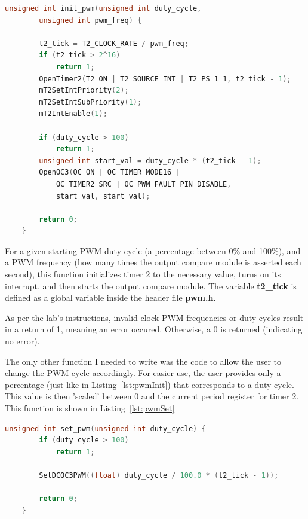 \documentclass[a4paper, 12pt]{article}
\begin{document}
	\begin{mdframed}[backgroundcolor=code-gray, roundcorner=10pt,
								innerleftmargin=5, innertopmargin=5, innerbottommargin=5]	
	\begin{lstlisting}[language=C, caption=PWM and Timer 2 Initialization, tabsize=2, label={lst:pwmInit}]
	unsigned int init_pwm(unsigned int duty_cycle,
		unsigned int pwm_freq) {
		
		t2_tick = T2_CLOCK_RATE / pwm_freq;
		if (t2_tick > 2^16)
			return 1;
		OpenTimer2(T2_ON | T2_SOURCE_INT | T2_PS_1_1, t2_tick - 1);
		mT2SetIntPriority(2);
		mT2SetIntSubPriority(1);
		mT2IntEnable(1);

		if (duty_cycle > 100)
			return 1;
		unsigned int start_val = duty_cycle * (t2_tick - 1);
		OpenOC3(OC_ON | OC_TIMER_MODE16 |
			OC_TIMER2_SRC | OC_PWM_FAULT_PIN_DISABLE,
			start_val, start_val);

		return 0;
	}
	\end{lstlisting}
	\end{mdframed}
	
For a given starting PWM duty cycle (a percentage between 0\% and 100\%), and a PWM frequency (how many times the output compare module is asserted each second), this function initializes timer 2 to the necessary value, turns on its interrupt, and then starts the output compare module. The variable \textbf{t2\_tick} is defined as a global variable inside the header file \textbf{pwm.h}. 

As per the lab's instructions, invalid clock PWM frequencies or duty cycles result in a return of 1, meaning an error occured. Otherwise, a 0 is returned (indicating no error).

The only other function I needed to write was the code to allow the user to change the PWM cycle accordingly. For easier use, the user provides only a percentage (just like in Listing~\ref{lst:pwmInit}) that corresponds to a duty cycle. This value is then 'scaled' between 0 and the current period register for timer 2. This function is shown in Listing~\ref{lst:pwmSet}

	\begin{mdframed}[backgroundcolor=code-gray, roundcorner=10pt,
								innerleftmargin=5, innertopmargin=5, innerbottommargin=5]	
	\begin{lstlisting}[language=C, caption=PWM Duty Cycle Set Function, tabsize=2, label={lst:pwmSet}]
	unsigned int set_pwm(unsigned int duty_cycle) {
		if (duty_cycle > 100)
			return 1;

		SetDCOC3PWM((float) duty_cycle / 100.0 * (t2_tick - 1));

		return 0;
	}
	\end{lstlisting}
	\end{mdframed}
	
\end{document}
